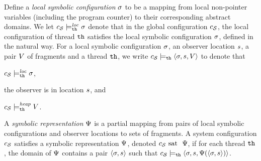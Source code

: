 Define a {\em local symbolic configuration} $\sigma$ to be
a mapping from local non-pointer
variables (including the program counter) to their corresponding abstract
domains.
We let $c_{\mathcal S} \models_{{\tt th}}^{\mathit{loc}} \sigma$ denote that in the
global configuration $c_{\mathcal S}$, the
local configuration of thread ${\tt th}$ satisfies the local symbolic
configuration $\sigma$, defined in the natural way.
For a local symbolic configuration
$\sigma$, an observer location $s$, a pair
$V$ of fragments and a thread ${\tt th}$, we write
$c_{\mathcal S} \models_{{\tt th}}
\left\langle\sigma,s,V\right\rangle$ to denote that
\begin{inparaenum}[(i)]
\item $c_{\mathcal S} \models_{{\tt th}}^{\mathit{loc}} \sigma$,
\item the observer is in location $s$, and
\item  $c_{\mathcal S} \models_{{\tt th}}^{\mathit{heap}} V$.
\end{inparaenum}
\begin{definition}
  \label{def:symbrep}
    A {\em symbolic representation} $\Psi$ is a partial mapping from
pairs of local symbolic configurations and observer locations to
sets of fragments.
A system configuration $c_{\mathcal S}$ satisfies a symbolic representation $\Psi$,
denoted $c_{\mathcal S} \mbox{ sat \ } \Psi$,
if for each thread ${\tt th}$, 
the domain of $\Psi$ contains a pair
$\left\langle\sigma,s\right\rangle$ such that
$c_{\mathcal S} \models_{{\tt th}}
\left\langle\sigma,s,\Psi(\left\langle\sigma,s\right\rangle)\right\rangle$.
\end{definition}



